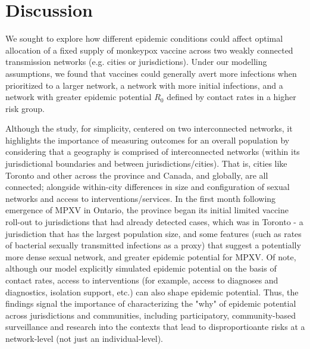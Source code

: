\section{Discussion}  %
We sought to explore how different epidemic conditions
could affect optimal allocation of a fixed supply of monkeypox vaccine
across two weakly connected transmission networks (e.g. cities or jurisdictions).
Under our modelling assumptions, we found that
vaccines could generally avert more infections when prioritized to
a larger network,
a network with more initial infections, and
a network with greater epidemic potential $R_0$
defined by contact rates in a higher risk group.
\par
Although the study, for simplicity, centered on two interconnected networks, it highlights the 
importance of measuring outcomes for an overall population by considering that a geography is comprised
of interconnected networks (within its jurisdictional boundaries and between jurisdictions/cities). 
That is, cities like Toronto and other across the province and Canada, and globally, are all connected; 
alongside within-city differences in size and configuration of sexual networks and access to interventions/services. %
In the first month following emergence of MPXV in Ontario, the province began its initial limited vaccine roll-out to 
jurisdictions that had already detected cases, which was in Toronto - a jurisdiction that has the largest population size, 
and some features (such as rates of bacterial sexually transmitted infections as a proxy) that suggest a potentially more dense sexual network, and greater epidemic potential for MPXV. %
Of note, although our model explicitly simulated epidemic potential on the basis of contact rates, access to interventions (for example, access to diagnoses and diagnostics, isolation support, etc.) can also shape epidemic potential. %
Thus, the findings signal the importance of characterizing the "why" of epidemic potential across jurisdictions and communities, including participatory, community-based surveillance and research into the contexts that lead to disproportioante risks at a network-level (not just an individual-level). %
\par
